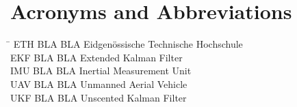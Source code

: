 \section*{Acronyms and Abbreviations}

\begin{tabbing}
 \hspace*{1.6cm}  \= \kill
 ETH \> BLA BLA Eidgenössische Technische Hochschule \\[0.5ex]
 EKF \> BLA BLA Extended Kalman Filter \\[0.5ex]
 IMU \> BLA BLA Inertial Measurement Unit \\[0.5ex]
 UAV \> BLA BLA Unmanned Aerial Vehicle \\[0.5ex]
 UKF \> BLA BLA Unscented Kalman Filter \\[0.5ex]
\end{tabbing}